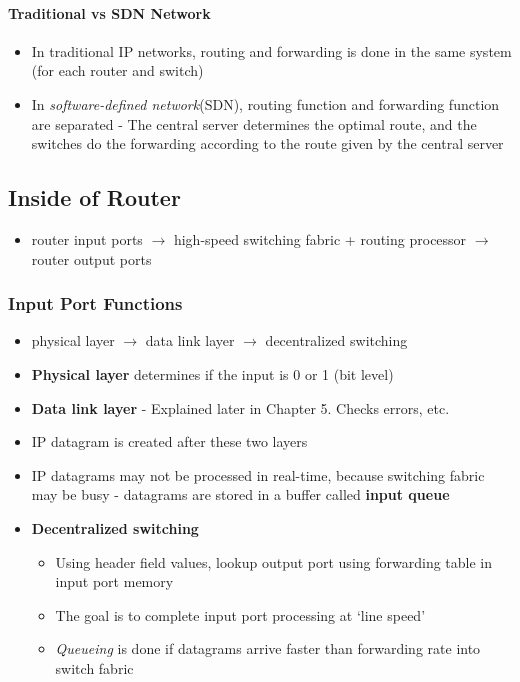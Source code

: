 \paragraph{Traditional vs SDN Network}
\begin{itemize}
	\item In traditional IP networks, routing and forwarding is done in the same system (for each router and switch)
	\item In \textit{software-defined network}(SDN), routing function and forwarding function are separated - The central server determines the optimal route, and the switches do the forwarding according to the route given by the central server 
\end{itemize}

\subsection{Inside of Router}
\begin{itemize}
	\item router input ports $\rightarrow$ high-speed switching fabric + routing processor $\rightarrow$ router output ports
\end{itemize}

\subsubsection{Input Port Functions}
\begin{itemize}
	\item physical layer $\rightarrow$ data link layer $\rightarrow$ decentralized switching
	\item \textbf{Physical layer} determines if the input is 0 or 1 (bit level)
	\item \textbf{Data link layer} - Explained later in Chapter 5. Checks errors, etc.
	\item IP datagram is created after these two layers
	\item IP datagrams may not be processed in real-time, because switching fabric may be busy - datagrams are stored in a buffer called \textbf{input queue}
	\item \textbf{Decentralized switching}
	\begin{itemize}
		\item Using header field values, lookup output port using forwarding table in input port memory
		\item The goal is to complete input port processing at `line speed'
		\item \textit{Queueing} is done if datagrams arrive faster than forwarding rate into switch fabric
	\end{itemize}
\end{itemize}

